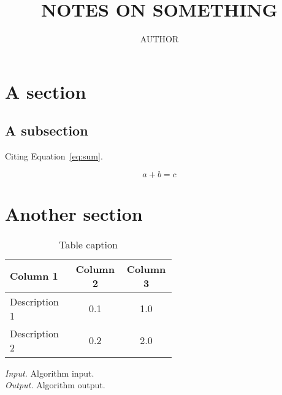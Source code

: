 \documentclass[a4paper, 12pt]{article}
\begin{document}
\title{NOTES ON SOMETHING}
\author{AUTHOR}
\maketitle{}

\section{A section}
\blindtext[1]{}

\subsection{A subsection}
\blindtext[1]{}

Citing Equation~\ref{eq:sum}.

\begin{equation}
\label{eq:sum}
    a + b = c
\end{equation}

\section{Another section}
\blindtext[2]{}

\begin{table}[hbt!]
  \centering
  \renewcommand{\arraystretch}{1.1}
  \caption{Table caption}
  \begin{tabular}{p{0.3\linewidth}c{0.12\linewidth}c{0.12\linewidth}}
   \toprule
   \textbf{Column 1} & \textbf{Column 2} & \textbf{Column 3} \\
   \midrule
   Description 1 & 0.1 & 1.0 \\
   Description 2 & 0.2 & 2.0 \\
  \bottomrule
  \end{tabular}\label{tab:table}
  \renewcommand{\arraystretch}{1}
\end{table}

\begin{algorithm}[hbt!]
\caption{$\textrm{AlgorithmTitle}(q, P)$}
\textit{Input.} Algorithm input. \\
\textit{Output.} Algorithm output.
\begin{algorithmic}[1]
  \label{linea}
    \Else{}
    \EndIf{}
      \label{lineb}
      \EndIf{}
    \EndFor{}
\end{algorithmic}\label{alg:example}
\end{algorithm}
\end{document}
